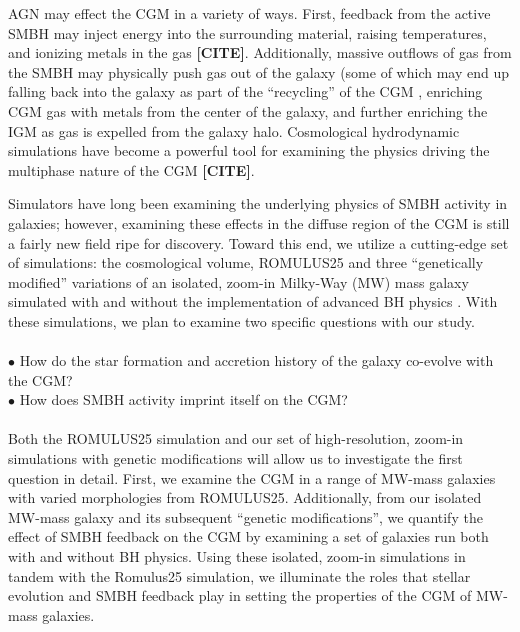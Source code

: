 \documentclass[]{emulateapj}
\begin{document}
AGN may effect the CGM in a variety of ways. First, feedback from the active SMBH may inject energy into the surrounding material, raising temperatures, and ionizing metals in the gas \textbf{[CITE]}. Additionally, massive outflows of gas from the SMBH may physically push gas out of the galaxy (some of which may end up falling back into the galaxy as part of the ``recycling'' of the CGM \citep[MORE]{Tumlinson2017}, enriching CGM gas with metals from the center of the galaxy, and further enriching the IGM as gas is expelled from the galaxy halo. Cosmological hydrodynamic simulations have become a powerful tool for examining the physics driving the multiphase nature of the CGM \textbf{[CITE]}. 

Simulators have long been examining the underlying physics of SMBH activity in galaxies; however, examining these effects in the diffuse region of the CGM is still a fairly new field ripe for discovery. Toward this end, we utilize a cutting-edge set of simulations: the cosmological volume, ROMULUS25 \citep{Tremmel2017} and three ``genetically modified'' variations of an isolated, zoom-in Milky-Way (MW) mass galaxy \citep{Roth2016,Pontzen2016} simulated with and without the implementation of advanced BH physics \citep{Tremmel2015}. With these simulations, we plan to examine two specific questions with our study. \\
\\
$\bullet$ How do the star formation and accretion history of the galaxy co-evolve with the CGM? \\
$\bullet$ How does SMBH activity imprint itself on the CGM? \\
\\
Both the ROMULUS25 simulation and our set of high-resolution, zoom-in simulations with genetic modifications will allow us to investigate the first question in detail. First, we examine the CGM in a range of MW-mass galaxies with varied morphologies from ROMULUS25. Additionally, from our isolated MW-mass galaxy and its subsequent ``genetic modifications'', we quantify the effect of SMBH feedback on the CGM by examining a set of galaxies run both with and without BH physics. Using these isolated, zoom-in simulations in tandem with the Romulus25 simulation, we illuminate the roles that stellar evolution and SMBH feedback play in setting the properties of the CGM of MW-mass galaxies.
\end{document}
